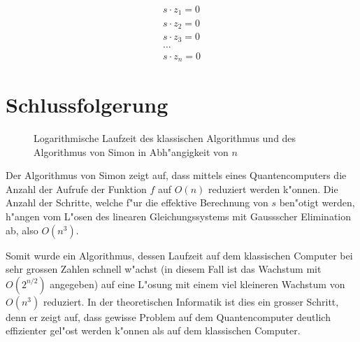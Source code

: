 \begin{refsection}
\begin{align*}
    s \cdot z_{1} = 0
    \\
    s \cdot z_{2} = 0
    \\
    s \cdot z_{3} = 0
    \\
    \dots
    \\
    s \cdot z_{n} = 0
\end{align*}

\section{Schlussfolgerung}

\begin{figure}[H]
\centering
{}
\caption{Logarithmische Laufzeit des klassischen Algorithmus und des
Algorithmus von Simon in Abh"angigkeit von $n$\label{simon:laufzeitgraph}}
\end{figure}

Der Algorithmus von Simon zeigt auf, dass mittels eines Quantencomputers die
Anzahl der Aufrufe der Funktion $f$ auf $O(n)$ reduziert werden k"onnen. Die
Anzahl der Schritte, welche f"ur die effektive Berechnung von $s$ ben"otigt
werden, h"angen vom L"osen des linearen Gleichungssystems mit Gaussscher
Elimination ab, also $O(n^3)$. 
\cite{simon:cs191}

Somit wurde ein Algorithmus, dessen Laufzeit auf dem klassischen Computer bei
sehr grossen Zahlen schnell w"achst (in diesem Fall ist das Wachstum mit
$O(2^{n/2})$ angegeben) auf eine L"osung mit einem viel kleineren Wachstum von
$O(n^3)$ reduziert. In der theoretischen Informatik ist dies ein grosser
Schritt, denn er zeigt auf, dass gewisse Problem auf dem Quantencomputer
deutlich effizienter gel"ost werden k"onnen als auf dem klassischen Computer.


\printbibliography[heading=subbibliography] \end{refsection}


